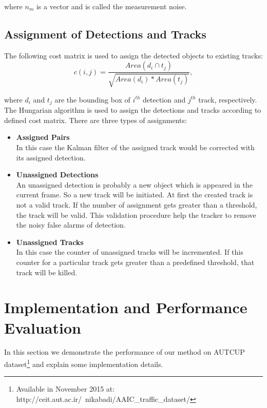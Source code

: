 \documentclass[conference]{IEEEtran}
\begin{document}
where $n_m$ is a vector and is called the measurement noise. 


\subsection{Assignment of Detections and Tracks}

The following cost matrix is used to assign the detected objects to existing tracks:
\begin{equation}\nonumber
c(i,j)= \frac{Area(d_i\cap t_j)}{\sqrt{Area(d_i)*Area(t_j)}},
\end{equation}

where $d_i$ and $t_j$ are the bounding box of $i^{th}$ detection and $j^{th}$ track, respectively. The Hungarian algorithm \cite{} is used to assign the detections and tracks according to defined cost matrix. There are three types of assignments:
\begin{itemize}
\item \textbf{Assigned Pairs}\\
In this case the Kalman filter of the assigned track would be corrected with its assigned detection.

\item \textbf{Unassigned Detections}\\
An unassigned detection is probably a new object which is appeared in the current frame. So a new track will be initiated. At first the created track is not a valid track. If the number of assignment gets greater than a threshold, the track will be valid. This validation procedure help the tracker to remove the noisy false alarms of detection.

\item \textbf{Unassigned Tracks}\\	
In this case the counter of unassigned tracks will be incremented. If this counter for a particular track gets greater than a predefined threshold, that track will be killed. 
	
\end{itemize}






\section{Implementation and Performance Evaluation}
In this section we demonstrate the performance of our method on AUTCUP dataset\footnote{Available in November 2015 at: http://ceit.aut.ac.ir/~nikabadi/AAIC\_traffic\_dataset/} and explain some implementation details.\\
\end{document}

